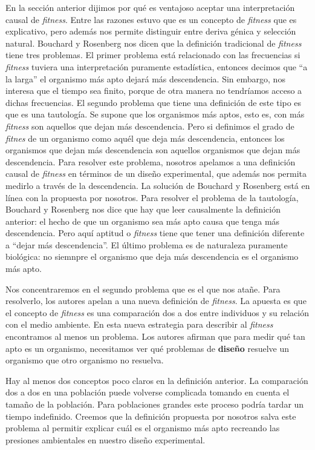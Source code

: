 En la sección anterior dijimos por qué es ventajoso aceptar una interpretación causal de \emph{fitness}. Entre las razones estuvo que es un concepto de \emph{fitness} que es explicativo, pero además nos permite distinguir entre deriva génica y selección natural. Bouchard y Rosenberg \cite{Bouchard2004} nos dicen que la definición tradicional de \emph{fitness} tiene tres problemas. El primer problema está relacionado con las frecuencias si \emph{fitness} tuviera una interpretación puramente estadística, entonces decimos que ``a la larga'' el organismo más apto dejará más descendencia. Sin embargo, nos interesa que el tiempo sea finito, porque de otra manera no tendríamos acceso a dichas frecuencias. El segundo problema que tiene una definición de este tipo es que es una tautología. Se supone que los organismos más aptos, esto es, con más \emph{fitness} son aquellos que dejan más descendencia. Pero si definimos el grado de \emph{fitnes} de un organismo como aquél que deja más descendencia, entonces los organismos que dejan más descendencia son aquellos organismos que dejan más descendencia. Para resolver este problema, nosotros apelamos a una definición causal de \emph{fitness} en términos de un diseño experimental, que además nos permita medirlo a través de la descendencia. La solución de Bouchard y Rosenberg está en línea con la propuesta por nosotros. Para resolver el problema de la tautología, Bouchard y Rosenberg nos dice que hay que leer causalmente la definición anterior: el hecho de que un organismo sea más apto causa que tenga más descendencia. Pero aquí aptitud o \emph{fitness} tiene que tener una definición diferente a ``dejar más descendencia''. El último problema es de naturaleza puramente biológica: no siemnpre el organismo que deja más descendencia es el organismo más apto.

Nos concentraremos en el segundo problema que es el que nos atañe. Para resolverlo, los autores apelan a una nueva definición de \emph{fitness}. La apuesta es que el concepto de \emph{fitness} es una comparación dos a dos entre individuos y su relación con el medio ambiente. En esta nueva estrategia para describir al \emph{fitness} encontramos al menos un problema. Los autores afirman que para medir qué tan apto es un organismo, necesitamos ver qué problemas de \textbf{diseño} resuelve un organismo que otro organismo no resuelva.

Hay al menos dos conceptos poco claros en la definición anterior. La comparación dos a dos en una población puede volverse complicada tomando en cuenta el tamaño de la población. Para poblaciones grandes este proceso podría tardar un tiempo indefinido. Creemos que la definición propuesta por nosotros salva este problema al permitir explicar cuál es el organismo más apto recreando las presiones ambientales en nuestro diseño experimental.


